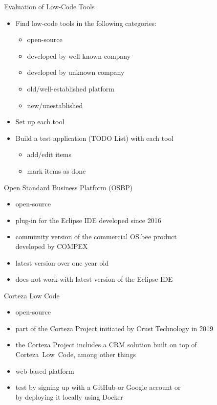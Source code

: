 \documentclass[aspectratio=169]{beamer}
\begin{document}
  \begin{frame}{Evaluation of Low-Code Tools}
    \begin{itemize}
      \item Find low-code tools in the following categories:
          \begin{itemize}
            \item open-source
            \item developed by well-known company
            \item developed by unknown company
            \item old/well-established platform
            \item new/unestablished
          \end{itemize}
      \item Set up each tool
      \item Build a test application (TODO List) with each tool \\
        \begin{itemize}
          \item add/edit items
          \item mark items as done
        \end{itemize}
    \end{itemize}
  \end{frame}

  \begin{frame}{Open Standard Business Platform (OSBP)}
    \begin{itemize}
      \item open-source
      \item plug-in for the Eclipse IDE developed since 2016
      \item community version of the commercial OS.bee product \\
            developed by COMPEX
      \item latest version over one year old
      \item does not work with latest version of the Eclipse IDE
    \end{itemize}
  \end{frame}

  \begin{frame}{Corteza Low Code}
    \begin{itemize}
      \item open-source
      \item part of the Corteza Project initiated by Crust Technology in 2019
      \item the Corteza Project includes a CRM solution built on top of Corteza~Low~Code, among other things
      \item web-based platform
      \item test by signing up with a GitHub or Google account or \\
            by deploying it locally using Docker
    \end{itemize}
  \end{frame}
\end{document}
